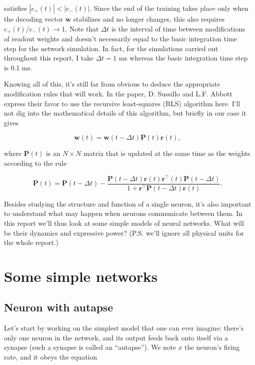 \noindent
satisfies $|e_+(t)| < |e_-(t)|$. Since the end of the training takes place
only when the decoding vector $\mathbf{w}$ stabilizes and no longer changes,
this also requires $e_+(t)/e_-(t) \rightarrow 1$. 
Note that $\Delta t$ is the interval of time
between modifications of readout weights and doesn't necessarily equal to
the basic integration time step for the network simulation. In fact,
for the simulations carried out throughout this report, I take 
$\Delta t = 1$ ms whereas the basic integration time step is 0.1 ms.

Knowing all of this, it's still far from obvious to deduce the appropriate
modification rules that will work. In the paper, D. Sussillo and L.F. Abbott
express their favor to use the recursive least-squares (RLS) algorithm here.
I'll not dig into the mathematical details of this algorithm, but briefly
in our case it gives

\[\mathbf{w}(t) = \mathbf{w}(t-\Delta t)\mathbf{P}(t)\mathbf{r}(t),\]

\noindent
where $\mathbf{P}(t)$ is an $N \times N$ matrix that is updated at the same
time as the weights according to the rule

\[\mathbf{P}(t) = \mathbf{P}(t-\Delta t) 
  - \frac{\mathbf{P}(t-\Delta t)\mathbf{r}(t)\mathbf{r}^{\top}(t)
    \mathbf{P}(t-\Delta t)}
    {1 + \mathbf{r}^{\top}\mathbf{P}(t-\Delta t)\mathbf{r}(t)}.\]




\iffalse

Besides studying the structure and function of a single neuron, it's also
important to understand what may happen when neurons communicate between them.
In this report we'll thus look at some simple models of neural networks.
What will be their dynamics and expressive power? 
(P.S. we'll ignore all physical units for the whole report.)

\section{Some simple networks}

\subsection{Neuron with autapse}

Let's start by working on the simplest model that one can ever imagine:
there's only one neuron in the network, and its output feeds back onto 
itself via a synapse (such a synapse is called an ``autapse''). 
We note $x$ the neuron's firing rate, and it obeys the equation

